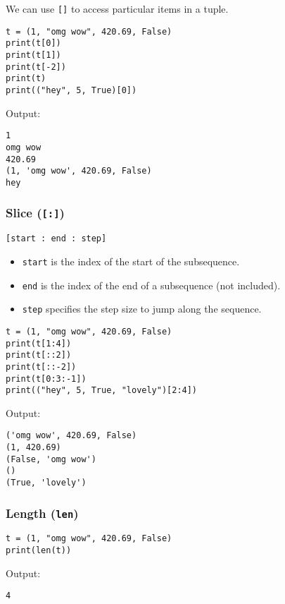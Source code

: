 \documentclass[11pt]{article}
\begin{document}
We can use \texttt{[]} to access particular items in a tuple.
\begin{verbatim}
t = (1, "omg wow", 420.69, False)
print(t[0])
print(t[1])
print(t[-2])
print(t)
print(("hey", 5, True)[0])
\end{verbatim}

 \noindent Output:

\begin{verbatim}
1
omg wow
420.69
(1, 'omg wow', 420.69, False)
hey
\end{verbatim}


 \newpage

\subsubsection{Slice (\texttt{[:]})}
\label{sec:orgff5a69b}
\texttt{[start : end : step]}
\begin{itemize}
\item \texttt{start} is the index of the start of the subsequence.
\item \texttt{end} is the index of the end of a subsequence (not included).
\item \texttt{step} specifies the step size to jump along the sequence.
\end{itemize}

\begin{verbatim}
t = (1, "omg wow", 420.69, False)
print(t[1:4])
print(t[::2])
print(t[::-2])
print(t[0:3:-1])
print(("hey", 5, True, "lovely")[2:4])
\end{verbatim}

 \noindent Output:

\begin{verbatim}
('omg wow', 420.69, False)
(1, 420.69)
(False, 'omg wow')
()
(True, 'lovely')
\end{verbatim}

\subsubsection{Length (\texttt{len})}
\label{sec:org2aa1665}
\begin{verbatim}
t = (1, "omg wow", 420.69, False)
print(len(t))
\end{verbatim}

 \noindent Output:

\begin{verbatim}
4
\end{verbatim}
\end{document}
